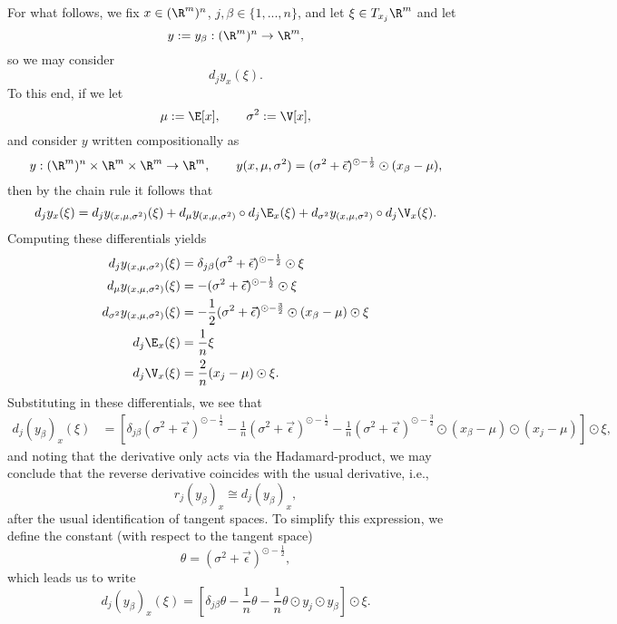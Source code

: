 For what follows, we fix $x\in(\R^m)^n$, $j,\beta\in\{1,...,n\}$, and let $\xi\in T_{x_j}\R^m$ and let 
$$y:=y_\beta:(\R^m)^n\to\R^m,$$
so we may consider
$$d_j y_x(\xi).$$
To this end, if we let
$$\mu:=\E[x],\qquad\sigma^2:=\V[x],$$
and consider $y$ written compositionally as
$$y:(\R^m)^n\times\R^m\times\R^m\to\R^m,\qquad y(x,\mu,\sigma^2)=(\sigma^2+\vec{\epsilon})^{\odot-\frac{1}{2}}\odot(x_\beta-\mu),$$
then by the chain rule it follows that
$$d_j y_x(\xi)=d_j y_{(x,\mu,\sigma^2)}(\xi)+d_\mu y_{(x,\mu,\sigma^2)}\circ d_j\E_x(\xi)+d_{\sigma^2}y_{(x,\mu,\sigma^2)}\circ d_j\V_x(\xi).$$
Computing these differentials yields
\begin{align*}
	d_j y_{(x,\mu,\sigma^2)}(\xi)&=\delta_{j\beta}(\sigma^2+\vec{\epsilon})^{\odot-\frac{1}{2}}\odot\xi\\
	d_\mu y_{(x,\mu,\sigma^2)}(\xi)&=-(\sigma^2+\vec{\epsilon})^{\odot-\frac{1}{2}}\odot\xi\\
	d_{\sigma^2}y_{(x,\mu,\sigma^2)}(\xi)&=-\frac{1}{2}(\sigma^2+\vec{\epsilon})^{\odot-\frac{3}{2}}\odot(x_\beta-\mu)\odot\xi\\
	d_j\E_x(\xi)&=\frac{1}{n}\xi\\
	d_j\V_x(\xi)&=\frac{2}{n}(x_j-\mu)\odot\xi.
\end{align*}
Substituting in these differentials, we see that
{\scriptsize
\begin{align*}
	d_j(y_\beta)_x(\xi)&=\left[\delta_{j\beta}(\sigma^2+\vec{\epsilon})^{\odot-\frac{1}{2}}-\frac{1}{n}(\sigma^2+\vec{\epsilon})^{\odot-\frac{1}{2}}-\frac{1}{n}(\sigma^2+\vec{\epsilon})^{\odot-\frac{3}{2}}\odot(x_\beta-\mu)\odot(x_j-\mu)\right]\odot\xi,
\end{align*}
}
and noting that the derivative only acts via the Hadamard-product, we may conclude that the reverse derivative coincides with the usual derivative, i.e.,
$$r_j(y_\beta)_x\cong d_j(y_\beta)_x,$$
after the usual identification of tangent spaces.  To simplify this expression, we define the constant (with respect to the tangent space)
$$\theta=(\sigma^2+\vec{\epsilon})^{\odot-\frac{1}{2}},$$
which leads us to write
$$d_j(y_\beta)_x(\xi)=[\delta_{j\beta}\theta-\frac{1}{n}\theta-\frac{1}{n}\theta\odot y_j\odot y_\beta]\odot\xi.$$



